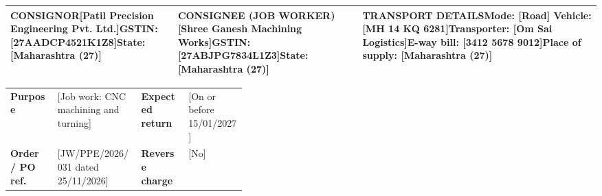 \documentclass[10pt]{article}
\begin{document}
{\renewcommand{\arraystretch}{1.3}\noindent\begin{tabularx}{\linewidth}{|X|X|X|}\hline
{\color{accent}\footnotesize\bfseries CONSIGNOR}\newline \textbf{[Patil Precision Engineering Pvt. Ltd.]}\newline GSTIN: [27AADCP4521K1Z8]\newline State: [Maharashtra (27)] & {\color{accent}\footnotesize\bfseries CONSIGNEE (JOB WORKER)}\newline \textbf{[Shree Ganesh Machining Works]}\newline GSTIN: [27ABJPG7834L1Z3]\newline State: [Maharashtra (27)] & {\color{accent}\footnotesize\bfseries TRANSPORT DETAILS}\newline \textbf{Mode: [Road]  \textbar{}  Vehicle: [MH 14 KQ 6281]}\newline Transporter: [Om Sai Logistics]\newline E-way bill: [3412 5678 9012]\newline Place of supply: [Maharashtra (27)] \\ \hline
\end{tabularx}}\par\vspace{6pt}

\begin{tabularx}{\linewidth}{@{}p{0.2\linewidth}X p{0.2\linewidth}X@{}}
\textbf{Purpose} & [Job work: CNC machining and turning] & \textbf{Expected return} & [On or before 15/01/2027] \\
\textbf{Order / PO ref.} & [JW/PPE/2026/031 dated 25/11/2026] & \textbf{Reverse charge} & [No] \\
\end{tabularx}\par\vspace{2pt}
\end{document}
